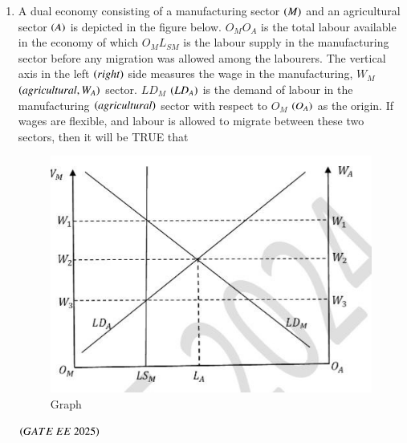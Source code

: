 \documentclass[journal,12pt,onecolumn]{IEEEtran}
\theoremstyle{remark}
\begin{document}
\begin{enumerate}
\item A dual economy consisting of a manufacturing sector  $\left(M\right)$ and an agricultural sector  $\left(A\right)$ is depicted in the figure below. $O_M O_A$ is the total labour available in the economy of which $O_M L_{SM}$ is the labour supply in the manufacturing sector before any migration was allowed among the labourers. The vertical axis in the left  $\left(right\right)$ side measures the wage in the manufacturing, $W_M$  $\left(agricultural, W_A\right)$ sector. $LD_M$  $\left(LD_A\right)$ is the demand of labour in the manufacturing  $\left(agricultural\right)$ sector with respect to $O_M$  $\left(O_A\right)$ as the origin. If wages are flexible, and labour is allowed to migrate between these two sectors, then it will be TRUE that
\begin{figure}
\includegraphics[scale=0.5]{figs/Q47.jpg}
\vspace{0.2cm}
\caption{Graph}
\end{figure}

\hfill $\left(GATE\ EE\ 2025\right)$
\begin{enumerate}
\end{enumerate}
 

\end{enumerate}
\end{document}
